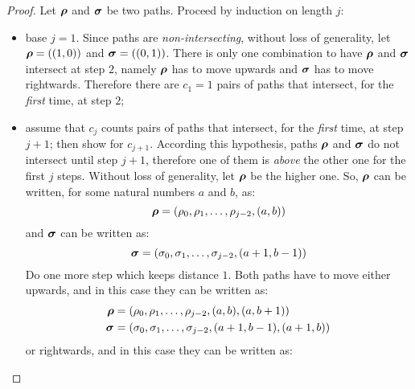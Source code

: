 \begin{proof}
    Let $\boldsymbol{\rho}$ and $\boldsymbol{\sigma}$ be two paths. Proceed by 
    induction on length $j$:
    \begin{itemize}
        \item base $j=1$. Since paths are \emph{non-intersecting}, without loss
            of generality, let $\boldsymbol{\rho}=((1,0))$ and $\boldsymbol{\sigma}=((0,1))$.
            There is only one combination to have $\boldsymbol{\rho}$ and $\boldsymbol{\sigma}$
            intersect at step $2$, namely $\boldsymbol{\rho}$ has to move upwards and
            $\boldsymbol{\sigma}$ has to move rightwards. Therefore there are $c_{1}=1$ pairs
            of paths that intersect, for the \emph{first} time, at step $2$; 
        \item assume that $c_j$ counts pairs of paths that intersect, 
            for the \emph{first} time, at step $j+1$; then show for $c_{j+1}$. 
            According this hypothesis, paths $\boldsymbol{\rho}$ and $\boldsymbol{\sigma}$ 
            do not intersect until step $j+1$, therefore one of them is \emph{above}
            the other one for the first $j$ steps. 
            Without loss of generality, let $\boldsymbol{\rho}$ be the higher one. So, 
            $\boldsymbol{\rho}$ can be written, for some natural numbers $a$ and $b$, as:
            \begin{displaymath}
                \boldsymbol{\rho}=(\rho_{0},\rho_{1},\ldots,\rho_{j-2},(a, b))
            \end{displaymath}
            and $\boldsymbol{\sigma}$ can be written as:
            \begin{displaymath}
                \boldsymbol{\sigma}=(\sigma_{0},\sigma_{1},\ldots,\sigma_{j-2},(a+1, b-1))
            \end{displaymath}
            Do one more step which keeps distance $1$. Both paths have to move
            either upwards, and in this case they can be written as:
            \begin{displaymath}
                \begin{split}
                    \boldsymbol{\rho}&=(\rho_{0},\rho_{1},\ldots,\rho_{j-2},(a, b),(a, b+1))\\
                    \boldsymbol{\sigma}&=(\sigma_{0},\sigma_{1},\ldots,\sigma_{j-2},(a+1,b-1), (a+1, b))
                \end{split}
            \end{displaymath}
            or rightwards, and in this case they can be written as:
            \begin{displaymath}

\end{displaymath}
\end{itemize}
\end{proof}
